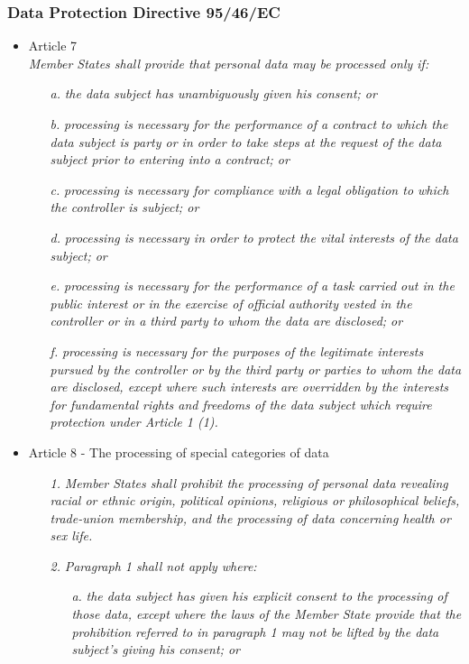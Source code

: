 \documentclass[11pt]{article}
\newcommand{\DPD}{Data Protection Directive }
\begin{document}
\subsubsection{\DPD 95/46/EC}
\begin{itemize}
	

	\item Article 7\\
		\emph{Member States shall provide that personal data may be processed only if:}
			\begin{itemize}
				\item  [\textit{a.}] {\it the data subject has unambiguously given his consent; or}
				\item  [\textit{b.}] {\it processing is necessary for the performance of a contract to which the data subject is party or in order to take steps at the request of the data subject prior to entering into a contract; or}
				\item  [\textit{c.}] {\it processing is necessary for compliance with a legal obligation to which the controller is subject; or}
				\item  [\textit{d.}] {\it processing is necessary in order to protect the vital interests of the data subject; or}
				\item  [\textit{e.}] {\it processing is necessary for the performance of a task carried out in the public interest or in the exercise of official authority vested in the controller or in a third party to whom the data are disclosed; or}
				\item  [\textit{f.}] {\it processing is necessary for the purposes of the legitimate interests pursued by the controller or by the third party or parties to whom the data are disclosed, except where such interests are overridden by the interests for fundamental rights and freedoms of the data subject which require protection under Article 1 (1).}
			\end{itemize}

	\item Article 8 - The processing of special categories of data\\
		\begin{itemize}
			\item  [\textit{1.}] {\it Member States shall prohibit the processing of personal data revealing racial or ethnic origin, political opinions, religious or philosophical beliefs, trade-union membership, and the processing of data concerning health or sex life.}
			\item  [\textit{2.}] {\it Paragraph 1 shall not apply where:}
			\begin{itemize}
				\item  [\textit{a.}] {\it the data subject has given his explicit consent to the processing of those data, except where the laws of the Member State provide that the prohibition referred to in paragraph 1 may not be lifted by the data subject's giving his consent; or}		
			\end{itemize}


\end{itemize}
\end{itemize}
\end{document}
